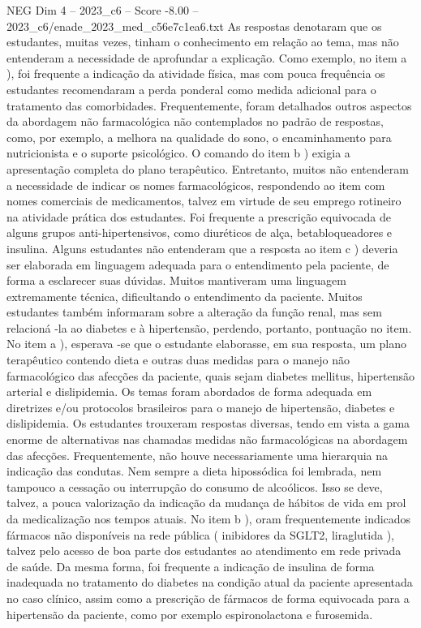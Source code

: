 \begin{textsample}{NEG Dim 4 – 2023\_c6 – Score -8.00 – 2023\_c6/enade\_2023\_med\_c56e7c1ea6.txt}
As respostas denotaram que os estudantes, muitas vezes, tinham o conhecimento em relação ao tema, mas não entenderam a necessidade de aprofundar a explicação.
Como exemplo, no item a ), foi frequente a indicação da atividade física, mas com pouca frequência os estudantes recomendaram a perda ponderal como medida adicional para o tratamento das comorbidades.
Frequentemente, foram detalhados outros aspectos da abordagem não farmacológica não contemplados no padrão de respostas, como, por exemplo, a melhora na qualidade do sono, o encaminhamento para nutricionista e o suporte psicológico.
O comando do item b ) exigia a apresentação completa do plano terapêutico.
Entretanto, muitos não entenderam a necessidade de indicar os nomes farmacológicos, respondendo ao item com nomes comerciais de medicamentos, talvez em virtude de seu emprego rotineiro na atividade prática dos estudantes.
Foi frequente a prescrição equivocada de alguns grupos anti-hipertensivos, como diuréticos de alça, betabloqueadores e insulina.
Alguns estudantes não entenderam que a resposta ao item c ) deveria ser elaborada em linguagem adequada para o entendimento pela paciente, de forma a esclarecer suas dúvidas.
Muitos mantiveram uma linguagem extremamente técnica, dificultando o entendimento da paciente.
Muitos estudantes também informaram sobre a alteração da função renal, mas sem relacioná -la ao diabetes e à hipertensão, perdendo, portanto, pontuação no item.
No item a ), esperava -se que o estudante elaborasse, em sua resposta, um plano terapêutico contendo dieta e outras duas medidas para o manejo não farmacológico das afecções da paciente, quais sejam diabetes mellitus, hipertensão arterial e dislipidemia.
Os temas foram abordados de forma adequada em diretrizes e/ou protocolos brasileiros para o manejo de hipertensão, diabetes e dislipidemia.
Os estudantes trouxeram respostas diversas, tendo em vista a gama enorme de alternativas nas chamadas medidas não farmacológicas na abordagem das afecções.
Frequentemente, não houve necessariamente uma hierarquia na indicação das condutas.
Nem sempre a dieta hipossódica foi lembrada, nem tampouco a cessação ou interrupção do consumo de alcoólicos.
Isso se deve, talvez, a pouca valorização da indicação da mudança de hábitos de vida em prol da medicalização nos tempos atuais.
No item b ), oram frequentemente indicados fármacos não disponíveis na rede pública ( inibidores da SGLT2, liraglutida ), talvez pelo acesso de boa parte dos estudantes ao atendimento em rede privada de saúde.
Da mesma forma, foi frequente a indicação de insulina de forma inadequada no tratamento do diabetes na condição atual da paciente apresentada no caso clínico, assim como a prescrição de fármacos de forma equivocada para a hipertensão da paciente, como por exemplo espironolactona e furosemida.

\end{textsample}
